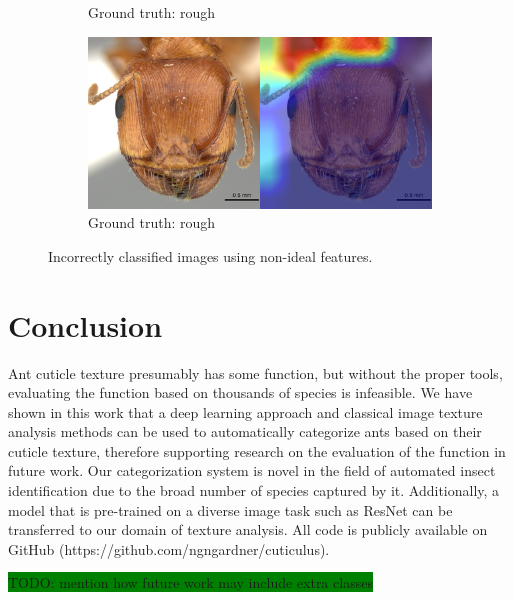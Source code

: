 \documentclass{aci}
\numberwithin{equation}{section}
\begin{document}
\begin{figure}
\begin{subfigure}{\subwidth}
        \caption{Ground truth: rough}
        \label{fig:incorrect_nonideal_61}
    \end{subfigure}
    \begin{subfigure}{\subwidth}
        \includegraphics[width=1\linewidth]{thesis_assets/gradcam/incorrect_nonideal/204.png}
        \caption{Ground truth: rough}
        \label{fig:incorrect_nonideal_204}
    \end{subfigure}
    \caption{Incorrectly classified images using non-ideal features.}
    \label{fig:incorrect_nonideal}
\end{figure}

\FloatBarrier
\section{Conclusion}
Ant cuticle texture presumably has some function, but without the proper tools,
evaluating the function based on thousands of species is infeasible. We have
shown in this work that a deep learning approach and classical image texture
analysis methods can be used to automatically categorize ants based on their
cuticle texture, therefore supporting research on the evaluation of the function
in future work. Our categorization system is novel in the field of automated
insect identification due to the broad number of species captured by it.
Additionally, a model that is pre-trained on a diverse image task such as ResNet
can be transferred to our domain of texture analysis. All code is publicly
available on GitHub (https://github.com/ngngardner/cuticulus).

\colorbox{green}{TODO: mention how future work may include extra classes}



\end{document}
